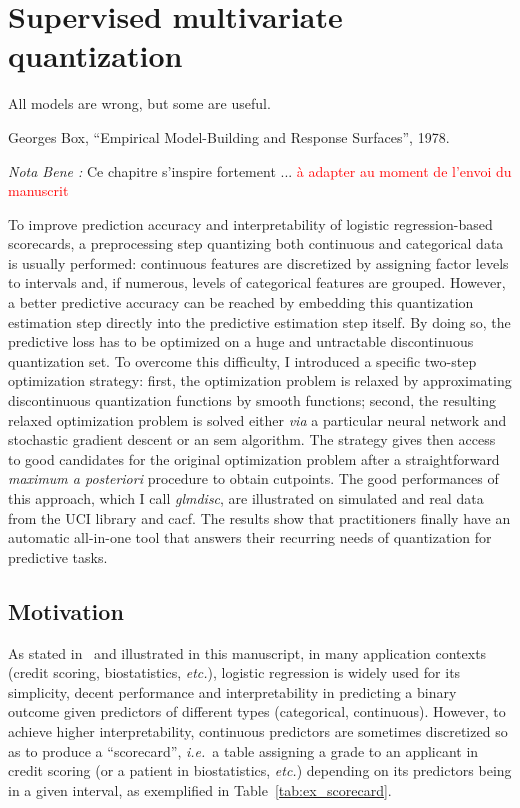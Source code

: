 \chapter{Supervised multivariate quantization} \label{chap4}


\epigraph{All models are wrong, but some are useful.}{Georges Box, ``Empirical Model-Building and Response Surfaces'', 1978.}

\minitoc

\textit{Nota Bene :} Ce chapitre s'inspire fortement ... \textcolor{red}{à adapter au moment de l'envoi du manuscrit}

\bigskip

To improve prediction accuracy and interpretability of logistic regression-based scorecards, a preprocessing step quantizing both continuous and categorical data is usually performed: continuous features are discretized by assigning factor levels to intervals and, if numerous, levels of categorical features are grouped. However, a better predictive accuracy can be reached by embedding this quantization estimation step directly into the predictive estimation step itself. By doing so, the predictive loss has to be optimized on a huge and untractable discontinuous quantization set. To overcome this difficulty, I introduced a specific two-step optimization strategy: first, the optimization problem is relaxed by approximating discontinuous quantization functions by smooth functions; second, the resulting relaxed optimization problem is solved either \textit{via} a particular neural network and stochastic gradient descent or an \gls{sem} algorithm. The strategy gives then access to good candidates for the original optimization problem after a straightforward \textit{maximum a posteriori} procedure to obtain cutpoints. The good performances of this approach, which I call \textit{glmdisc}, are illustrated on simulated and real data from the UCI library and \gls{cacf}. The results show that practitioners finally have an automatic all-in-one tool that answers their recurring needs of quantization for predictive tasks.
 
\section{Motivation}

As stated in~\cite{hosmer2013applied} and illustrated in this manuscript, in many application contexts (credit scoring, biostatistics, {\it etc.}), logistic regression is widely used for its simplicity, decent performance and interpretability in predicting a binary outcome given predictors of different types (categorical, continuous). However, to achieve  higher interpretability, continuous predictors are sometimes discretized so as to produce a ``scorecard'', \textit{i.e.}\ a table assigning a grade to an applicant in credit scoring (or a patient in biostatistics, {\it etc.}) depending on its predictors being in a given interval, as exemplified in Table~\ref{tab:ex_scorecard}.

